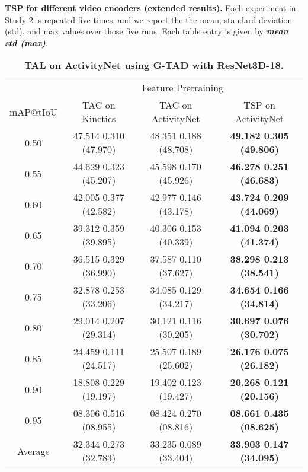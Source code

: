 \documentclass[10pt,twocolumn,letterpaper]{article}
\begin{document}
 \begin{table*}[t]
    \small
    \centering
    \caption{\textbf{TSP for different video encoders (extended results).} Each experiment in Study 2 is repeated five times, and we report the the mean, standard deviation (std), and max values over those five runs. Each table entry is given by \textit{\textbf{mean  std (max)}}.}
    \label{table:supp_mat_extended_ablation_study_2}
\begin{subtable}{\linewidth}
    \centering
    \vspace{-5pt}
    \caption{\bf TAL on ActivityNet using G-TAD with ResNet3D-18.}
    \vspace{-5pt}
    \begin{tabular}{c|ccc}
    \toprule 
            & \multicolumn{3}{c}{Feature Pretraining} \\ 
    mAP@tIoU& TAC on Kinetics                           & TAC on ActivityNet                        & TSP on ActivityNet \\ \midrule
    0.50    & 47.514 {\scriptsize  0.310} (47.970) & 48.351 {\scriptsize  0.188} (48.708) &\bf 49.182 {\scriptsize  0.305} (49.806) \\
    0.55    & 44.629 {\scriptsize  0.323} (45.207) & 45.598 {\scriptsize  0.170} (45.926) &\bf 46.278 {\scriptsize  0.251} (46.683) \\
    0.60    & 42.005 {\scriptsize  0.377} (42.582) & 42.977 {\scriptsize  0.146} (43.178) &\bf 43.724 {\scriptsize  0.209} (44.069) \\
    0.65    & 39.312 {\scriptsize  0.359} (39.895) & 40.306 {\scriptsize  0.153} (40.339) &\bf 41.094 {\scriptsize  0.203} (41.374) \\
    0.70    & 36.515 {\scriptsize  0.329} (36.990) & 37.587 {\scriptsize  0.110} (37.627) &\bf 38.298 {\scriptsize  0.213} (38.541) \\
    0.75    & 32.878 {\scriptsize  0.253} (33.206) & 34.085 {\scriptsize  0.129} (34.217) &\bf 34.654 {\scriptsize  0.166} (34.814) \\
    0.80    & 29.014 {\scriptsize  0.207} (29.314) & 30.121 {\scriptsize  0.116} (30.205) &\bf 30.697 {\scriptsize  0.076} (30.702) \\
    0.85    & 24.459 {\scriptsize  0.111} (24.517) & 25.507 {\scriptsize  0.189} (25.602) &\bf 26.176 {\scriptsize  0.075} (26.182) \\
    0.90    & 18.808 {\scriptsize  0.229} (19.197) & 19.402 {\scriptsize  0.123} (19.427) &\bf 20.268 {\scriptsize  0.121} (20.156) \\
    0.95    & 08.306 {\scriptsize  0.516} (08.955) & 08.424 {\scriptsize  0.270} (08.816) &\bf 08.661 {\scriptsize  0.435} (08.625) \\ \midrule
\rowcolor{Gray}
    Average & 32.344 {\scriptsize  0.273} (32.783) & 33.235 {\scriptsize  0.089} (33.404) &\bf 33.903 {\scriptsize  0.147} (34.095) \\
    \bottomrule
    \end{tabular}
\end{subtable}


\end{table*}
\end{document}
